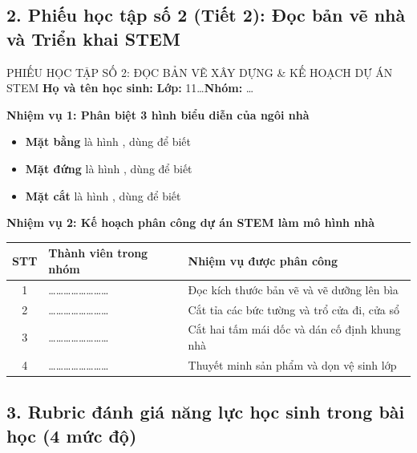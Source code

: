 \documentclass[12pt, a4paper]{article}
\begin{document}
\begin{itemize}[leftmargin=1.2cm]
\subsection*{2. Phiếu học tập số 2 (Tiết 2): Đọc bản vẽ nhà và Triển khai STEM}

\begin{pedabox}{PHIẾU HỌC TẬP SỐ 2: ĐỌC BẢN VẼ XÂY DỰNG \& KẾ HOẠCH DỰ ÁN STEM}
    \textbf{Họ và tên học sinh:} \dotfill \textbf{Lớp:} 11\dots \textbf{Nhóm:} \dots

    \textbf{Nhiệm vụ 1: Phân biệt 3 hình biểu diễn của ngôi nhà}
    \begin{itemize}[leftmargin=0.6cm]
        \item \textbf{Mặt bằng} là hình \dotfill, dùng để biết \dotfill
        \item \textbf{Mặt đứng} là hình \dotfill, dùng để biết \dotfill
        \item \textbf{Mặt cắt} là hình \dotfill, dùng để biết \dotfill
    \end{itemize}

    \textbf{Nhiệm vụ 2: Kế hoạch phân công dự án STEM làm mô hình nhà}
    \begin{center}
    \begin{tabular}{|c|l|l|}
    \hline
    \textbf{STT} & \textbf{Thành viên trong nhóm} & \textbf{Nhiệm vụ được phân công} \\ \hline
    1 & \dots\dots\dots\dots\dots\dots\dots\dots & Đọc kích thước bản vẽ và vẽ dưỡng lên bìa \\ \hline
    2 & \dots\dots\dots\dots\dots\dots\dots\dots & Cắt tỉa các bức tường và trổ cửa đi, cửa sổ \\ \hline
    3 & \dots\dots\dots\dots\dots\dots\dots\dots & Cắt hai tấm mái dốc và dán cố định khung nhà \\ \hline
    4 & \dots\dots\dots\dots\dots\dots\dots\dots & Thuyết minh sản phẩm và dọn vệ sinh lớp \\ \hline
    \end{tabular}
    \end{center}
\end{pedabox}

\subsection*{3. Rubric đánh giá năng lực học sinh trong bài học (4 mức độ)}


\end{itemize}
\end{document}
